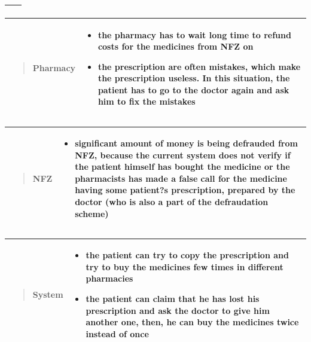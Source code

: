 \begin{table}[h]
\begin{tabular}{| p{3cm} | p{9cm} |}
\begin{itemize}
    \end{itemize}
    \\ \hline
    \end{tabular}
     \begin{tabular}{| p{3cm} | p{9cm} |}
     \hline
     \vspace*{\fill} \begin{quote} \centering Pharmacy \end{quote} \vspace*{\fill} & \begin{itemize}
     \item the pharmacy has to wait long time to refund
     costs for the medicines from NFZ on \newline
     \item the prescription are often mistakes, which make
     the prescription useless. In this situation, the
     patient has to go to the doctor again and ask
     him to fix the mistakes
     \end{itemize}
     \\ \hline
     \end{tabular}
  \begin{tabular}{| p{3cm} | p{9cm} |}
  \hline
  \vspace*{\fill} \begin{quote} \centering NFZ \end{quote} \vspace*{\fill} & \begin{itemize}
  \item significant amount of money is being defrauded
  from NFZ, because the current system does not
  verify if the patient himself has bought the
  medicine or the pharmacists has made a false
  call for the medicine having some patient?s prescription,
  prepared by the doctor (who is also a
  part of the defraudation scheme)
  \end{itemize}
  \\ \hline
  \end{tabular}
  \begin{tabular}{| p{3cm} | p{9cm} |}
    \hline
    \vspace*{\fill} \begin{quote} \centering System  \end{quote} \vspace*{\fill} & \begin{itemize}
    \item the patient can try to copy the prescription and
    try to buy the medicines few times in different
    pharmacies \newline
    \item the patient can claim that he has lost his prescription
    and ask the doctor to give him another
    one, then, he can buy the medicines twice instead
    of once
    \end{itemize}
    \\ \hline
    \end{tabular}
\end{table}

